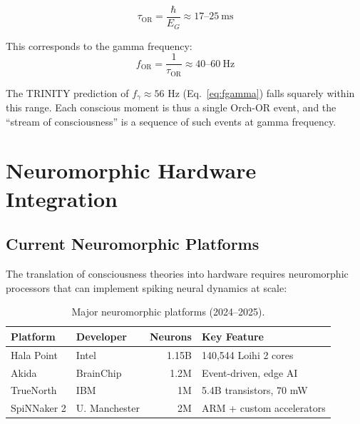 \documentclass[12pt,a4paper]{article}
\begin{document}
\begin{equation}
\tau_{\mathrm{OR}} = \frac{\hbar}{E_G} \approx 17\text{--}25~\text{ms}
\end{equation}

\noindent
This corresponds to the gamma frequency:
\begin{equation}
f_{\mathrm{OR}} = \frac{1}{\tau_{\mathrm{OR}}} \approx 40\text{--}60~\text{Hz}
\end{equation}

\noindent
The TRINITY prediction of $f_\gamma \approx 56$ Hz (Eq.~\ref{eq:fgamma}) falls
squarely within this range. Each conscious moment is thus a single Orch-OR
event, and the ``stream of consciousness'' is a sequence of such events at
gamma frequency.

\section{Neuromorphic Hardware Integration}
\label{sec:neuromorphic}

\subsection{Current Neuromorphic Platforms}

The translation of consciousness theories into hardware requires neuromorphic
processors that can implement spiking neural dynamics at scale:

\begin{table}[h!]
\centering
\caption{Major neuromorphic platforms (2024--2025).}
\label{tab:neuromorphic}
\begin{tabular}{@{}llrl@{}}
\toprule
\textbf{Platform} & \textbf{Developer} & \textbf{Neurons} & \textbf{Key Feature} \\
\midrule
Hala Point & Intel & 1.15B & 140,544 Loihi 2 cores \\
Akida & BrainChip & 1.2M & Event-driven, edge AI \\
TrueNorth & IBM & 1M & 5.4B transistors, 70 mW \\
SpiNNaker 2 & U. Manchester & 2M & ARM + custom accelerators \\
\bottomrule
\end{tabular}
\end{table}
\end{document}
